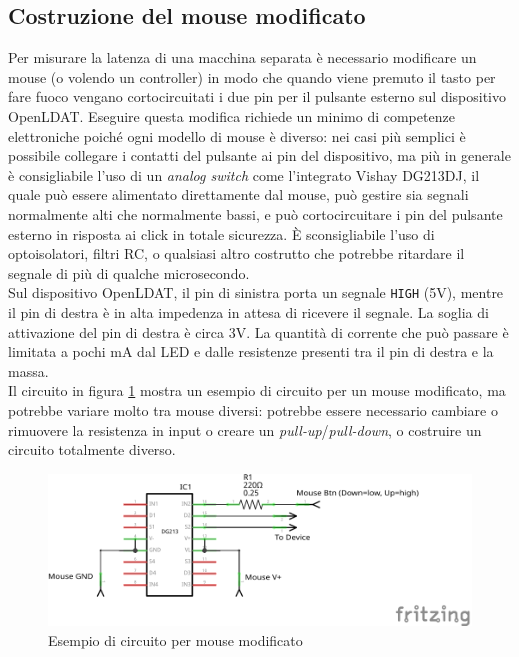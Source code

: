 \subsection{Costruzione del mouse modificato}
Per misurare la latenza di una macchina separata è necessario modificare un mouse (o volendo un controller) in modo che quando viene premuto il tasto per fare fuoco vengano cortocircuitati i due pin per il pulsante esterno sul dispositivo OpenLDAT. Eseguire questa modifica richiede un minimo di competenze elettroniche poiché ogni modello di mouse è diverso: nei casi più semplici è possibile collegare i contatti del pulsante ai pin del dispositivo, ma più in generale è consigliabile l'uso di un \textit{analog switch} come l'integrato Vishay DG213DJ\cite{vishay_dg213_datasheet}, il quale può essere alimentato direttamente dal mouse, può gestire sia segnali normalmente alti che normalmente bassi, e può cortocircuitare i pin del pulsante esterno in risposta ai click in totale sicurezza. È sconsigliabile l'uso di optoisolatori, filtri RC, o qualsiasi altro costrutto che potrebbe ritardare il segnale di più di qualche microsecondo.\\
Sul dispositivo OpenLDAT, il pin di sinistra porta un segnale \texttt{HIGH} (5V), mentre il pin di destra è in alta impedenza in attesa di ricevere il segnale. La soglia di attivazione del pin di destra è circa 3V\cite{atmega32u4_datasheet}. La quantità di corrente che può passare è limitata a pochi mA dal LED e dalle resistenze presenti tra il pin di destra e la massa.\\
Il circuito in figura \ref{fig:modmouse_example} mostra un esempio di circuito per un mouse modificato, ma potrebbe variare molto tra mouse diversi: potrebbe essere necessario cambiare o rimuovere la resistenza in input o creare un \textit{pull-up}/\textit{pull-down}, o costruire un circuito totalmente diverso.

\begin{figure}[h!]
	\centering
	\includegraphics[width=\textwidth]{Dispositivo_files/modmouse_example.png}
	\caption{Esempio di circuito per mouse modificato}
	\label{fig:modmouse_example}
\end{figure}

